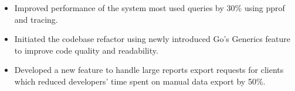\begin{itemize}
    \item Improved performance of the system most used queries by 30\% using pprof and tracing.
    \item Initiated the codebase refactor using newly introduced Go's Generics feature to improve 
            code quality and readability. 
    \item Developed a new feature to handle large reports export requests for clients which reduced developers' 
            time spent on manual data export by 50\%. 
\end{itemize}